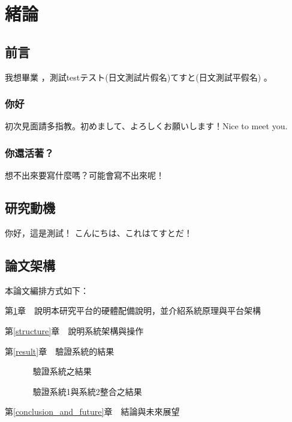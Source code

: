 
\chapter{緒論}\label{explanation}


\section{前言}\label{1-1}
我想畢業 \cite{m1}，測試testテスト(日文測試片假名)てすと(日文測試平假名)\cite{talbot97} 。

\subsection{你好}
初次見面請多指教。初めまして、よろしくお願いします！Nice to meet you.

\subsection{你還活著？}
想不出來要寫什麼嗎？可能會寫不出來呢！\cite{goossens97}

\newpage

\section{研究動機}\label{1-2}
你好，這是測試！
こんにちは、これはてすとだ！

\newpage

\section{論文架構}\label{1-3}

\n 本論文編排方式如下：

第\ref{explanation}章　說明本研究平台的硬體配備說明，並介紹系統原理與平台架構

第\ref{structure}章　說明系統架構與操作

第\ref{result}章　驗證系統的結果
		
　　　      驗證系統之結果

　　　      驗證系統1與系統2整合之結果

第\ref{conclusion_and_future}章　結論與未來展望
